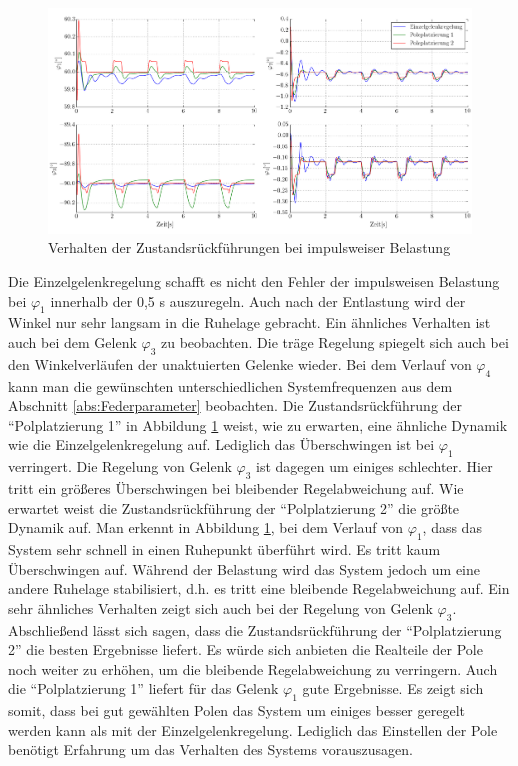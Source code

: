 	\begin{figure}[h!]
		\centering
		\includegraphics[scale=0.65]{Bilder/Ergebnissse_Zustandsrueckfuehrung.pdf}
		\caption{Verhalten der Zustandsrückführungen bei impulsweiser Belastung}
		\label{fig:Ergebnis_Zustandsruckfuhrung}
	\end{figure}

Die Einzelgelenkregelung schafft es nicht den Fehler der impulsweisen Belastung bei $\varphi_1$ innerhalb der 0,5 s auszuregeln. Auch nach der Entlastung wird der Winkel nur sehr langsam in die Ruhelage gebracht. Ein ähnliches Verhalten ist auch bei dem Gelenk  $\varphi_3$ zu beobachten. Die träge Regelung spiegelt sich auch bei den Winkelverläufen der unaktuierten Gelenke wieder. Bei dem Verlauf von $\varphi_4$ kann man die gewünschten unterschiedlichen Systemfrequenzen aus dem Abschnitt \ref{abs:Federparameter} beobachten.\newline
Die Zustandsrückführung der "`Polplatzierung 1"' in Abbildung \ref{fig:Ergebnis_Zustandsruckfuhrung} weist, wie zu erwarten, eine ähnliche Dynamik wie die Einzelgelenkregelung auf. Lediglich das Überschwingen ist bei $\varphi_1$ verringert. Die Regelung von Gelenk $\varphi_3$ ist dagegen um einiges schlechter. Hier tritt ein größeres Überschwingen bei bleibender Regelabweichung auf. \newline
Wie erwartet weist die Zustandsrückführung der "`Polplatzierung 2"' die größte Dynamik auf. Man erkennt in Abbildung \ref{fig:Ergebnis_Zustandsruckfuhrung}, bei dem Verlauf von $\varphi_1$, dass das System sehr schnell in einen Ruhepunkt überführt wird. Es tritt kaum Überschwingen auf. Während der Belastung wird das System jedoch um eine andere Ruhelage stabilisiert, d.h. es tritt eine bleibende Regelabweichung auf. Ein sehr ähnliches Verhalten zeigt sich auch bei der Regelung von Gelenk $\varphi_3$.\newline
Abschließend lässt sich sagen, dass die Zustandsrückführung der "`Polplatzierung 2"' die besten Ergebnisse liefert. Es würde sich anbieten die Realteile der Pole noch weiter zu erhöhen, um die bleibende Regelabweichung zu verringern. Auch die "`Polplatzierung 1"' liefert für das Gelenk $\varphi_1$ gute Ergebnisse. Es zeigt sich somit, dass bei gut gewählten Polen das System um einiges besser geregelt werden kann als mit der Einzelgelenkregelung. Lediglich das Einstellen der Pole benötigt Erfahrung um das Verhalten des Systems vorauszusagen. 

